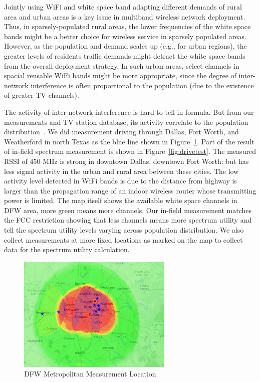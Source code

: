 Jointly using WiFi and white space band adapting different 
demands of rural area and urban areas is a key issue in 
multiband wireless network deployment. 
Thus, in sparsely-populated rural areas, the lower frequencies of the white space 
bands might be a better choice for wireless service in sparsely populated areas. 
However, as the population and demand scales up (e.g., 
for urban regions), the greater levels of residents traffic demands 
might detract the white space bands from the 
overall deployment strategy. In such urban areas, select channels in 
spacial reusable WiFi bands might be more appropriate, 
since the degree of inter-network interference is often  
proportional to the population (due to the existence of greater TV channels).

The activity of inter-network interference is hard to tell in formula. 
But from our measurements and TV station database, its activity correlate to the population distribution~\cite{msdatabase}.
We did measurement driving through Dallas, Fort Worth, and Weatherford in north 
Texas as the blue line shown in Figure~\ref{fig:drivemap}.
Part of the result of in-field spectrum measurement is shown in Figure~\ref{fig:drivetest}.
The measured RSSI of 450 MHz is strong in downtown Dallas, downtown Fort Worth;
but has less signal activity in the urban and rural area between these cities.
The low activity level detected in WiFi bands is due to the distance from highway is larger
than the propagation range of an indoor wireless router whose transmitting power is limited.
The map itself shows the available white space channels in DFW area, more green means
more channels. Our in-field measurement matches the FCC restriction showing that less channels means
more spectrum utility and tell the spectrum utility levels varying across population 
distribution. We also collect measurements at more fixed locations as marked on the map to collect
data for the spectrum utility calculation. 
   \begin{figure}
   \centering
   \includegraphics[width=74mm]{figures/drivemap}
   \vspace{-0.1in}
   \caption{DFW Metropolitan Measurement Location}                                                                 
   \label{fig:drivemap}
   \vspace{-0.1in}
   \end{figure}
   
